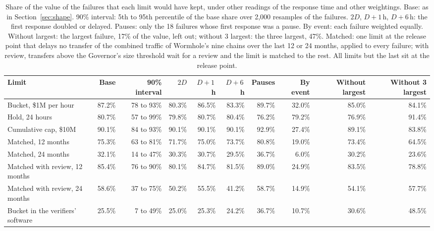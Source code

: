 \begin{table}[t]
\centering
\caption{Share of the value of the failures that each limit would have kept, under other readings of the response time and other weightings. Base: as in Section~\ref{sec:shape}. 90\% interval: 5th to 95th percentile of the base share over 2,000 resamples of the failures. $2D$, $D + 1$\,h, $D + 6$\,h: the first response doubled or delayed. Pauses: only the 18 failures whose first response was a pause. By event: each failure weighted equally. Without largest: the largest failure, 17\% of the value, left out; without 3 largest: the three largest, 47\%. Matched: one limit at the release point that delays no transfer of the combined traffic of Wormhole's nine chains over the last 12 or 24 months, applied to every failure; with review, transfers above the Governor's size threshold wait for a review and the limit is matched to the rest. All limits but the last sit at the release point.}
\label{tab:robust}
\footnotesize
\setlength{\tabcolsep}{4pt}
\begin{tabular}{@{}l r r r r r r r r r@{}}
\toprule
Limit & Base & 90\% interval & $2D$ & $D + 1$\,h & $D + 6$\,h & Pauses & By event & Without largest & Without 3 largest \\
\midrule
Bucket, \$1M per hour & 87.2\% & 78 to 93\% & 80.3\% & 86.5\% & 83.3\% & 89.7\% & 32.0\% & 85.0\% & 84.1\% \\
Hold, 24 hours & 80.7\% & 57 to 99\% & 79.8\% & 80.7\% & 80.4\% & 76.2\% & 79.2\% & 76.9\% & 91.4\% \\
Cumulative cap, \$10M & 90.1\% & 84 to 93\% & 90.1\% & 90.1\% & 90.1\% & 92.9\% & 27.4\% & 89.1\% & 83.8\% \\
Matched, 12 months & 75.3\% & 63 to 81\% & 71.7\% & 75.0\% & 73.7\% & 80.8\% & 19.0\% & 73.4\% & 64.5\% \\
Matched, 24 months & 32.1\% & 14 to 47\% & 30.3\% & 30.7\% & 29.5\% & 36.7\% & 6.0\% & 30.2\% & 23.6\% \\
Matched with review, 12 months & 85.4\% & 76 to 90\% & 80.1\% & 84.7\% & 81.5\% & 89.0\% & 24.9\% & 83.5\% & 78.8\% \\
Matched with review, 24 months & 58.6\% & 37 to 75\% & 50.2\% & 55.5\% & 41.2\% & 58.7\% & 14.9\% & 54.1\% & 57.7\% \\
Bucket in the verifiers' software & 25.5\% & 7 to 49\% & 25.0\% & 25.3\% & 24.2\% & 36.7\% & 10.7\% & 30.6\% & 48.5\% \\
\bottomrule
\end{tabular}
\end{table}
